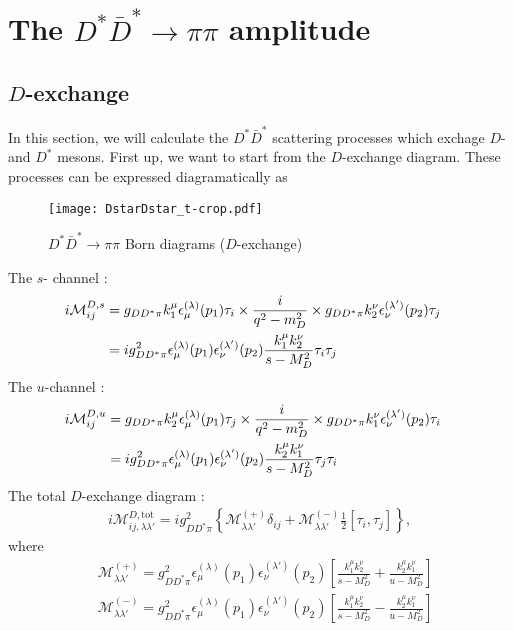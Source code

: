 \documentclass[aps,prd,preprintnumbers,showpacs,showkeys,nofootinbib,
superscriptaddress,fleqn,floatfix,tightenlines, 10pt]{revtex4-1}
\begin{document}
\section{The $D^* \bar{D}^* \rightarrow \pi\pi$ amplitude}

\subsection{$D$-exchange}
In this section, we will calculate the $D^* \bar{D}^*$ scattering processes
which exchage $D$- and $D^*$ mesons. First up, we want to start
from the $D$-exchange diagram. These processes can be expressed diagramatically as
\begin{figure}[H]
	\centering
	\texttt{[image: DstarDstar\_t-crop.pdf]}
	\caption{$D^* \bar{D}^* \rightarrow \pi\pi$ Born diagrams ($D$-exchange)}
	\label{fig4}
\end{figure}
The $s$- channel :
\begin{align}
	i\mathcal{M}_{ij}^{D,s} & = g_{DD^* \pi} k_1^\mu \epsilon_\mu^{(\lambda)}(p_1) \tau_i
	\times \frac{i}{q^2 - m_D^2} \times g_{DD^* \pi} k_2^\nu \epsilon_\nu^{(\lambda')}(p_2) \tau_j \cr
	& = i g_{DD^* \pi}^2 \epsilon_\mu^{(\lambda)} (p_1) \epsilon_\nu^{(\lambda')} (p_2)
	\frac{k_1^\mu k_2^\nu}{s - M_D^2} \tau_i \tau_j
\end{align}
The $u$-channel :
\begin{align}
	i\mathcal{M}_{ij}^{D,u} & = g_{DD^* \pi} k_2^\mu \epsilon_\mu^{(\lambda)}(p_1) \tau_j
	\times \frac{i}{q^2 - m_D^2} \times g_{DD^* \pi} k_1^\nu \epsilon_\nu^{(\lambda')}(p_2) \tau_i \cr
	& = i g_{DD^* \pi}^2 \epsilon_\mu^{(\lambda)} (p_1) \epsilon_\nu^{(\lambda')} (p_2)
	\frac{k_2^\mu k_1^\nu}{s - M_D^2} \tau_j \tau_i
\end{align}
The total $D$-exchange diagram :
\begin{align}
	i\mathcal{M}_{ij,\lambda \lambda'}^{D,\mathrm{tot}} = i g_{DD^* \pi}^2 \left\{
	\mathcal{M}_{\lambda \lambda'}^{(+)}\delta_{ij} + \mathcal{M}_{\lambda \lambda'}^{(-)}
	\frac{1}{2} [\tau_i, \tau_j] \right\},
\end{align}
where
\begin{align}
	 &\mathcal{M}^{(+)}_{\lambda \lambda'} = g_{D D^* \pi}^2
	\epsilon_\mu^{(\lambda)} (p_1) \epsilon_\nu^{(\lambda')} (p_2) \left[
	\frac{k_1^\mu k_2^\nu}{s - M_D^2} + \frac{k_2^\mu k_1^\nu}{u - M_D^2} \right] \\
	 &\mathcal{M}^{(-)}_{\lambda \lambda'} = g_{D D^* \pi}^2
	\epsilon_\mu^{(\lambda)} (p_1) \epsilon_\nu^{(\lambda')} (p_2) \left[
	\frac{k_1^\mu k_2^\nu}{s - M_D^2} - \frac{k_2^\mu k_1^\nu}{u - M_D^2} \right]
\end{align}
\end{document}
